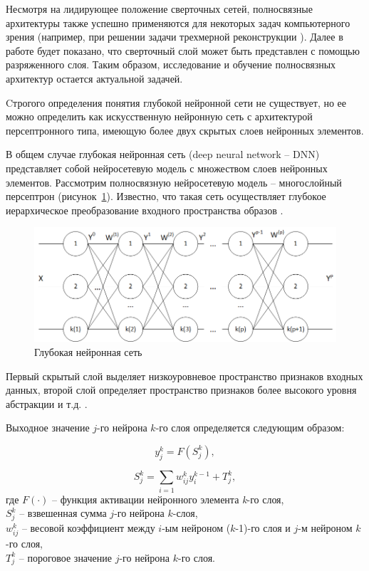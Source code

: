 Несмотря на лидирующее положение сверточных сетей, полносвязные архитектуры также успешно применяются для некоторых задач компьютерного зрения (например, при решении задачи трехмерной реконструкции \cite{mildenhall2020nerf}). Далее в работе будет показано, что сверточный слой может быть представлен с помощью разряженного слоя. Таким образом, исследование и обучение полносвязных архитектур остается актуальной задачей. 

Cтрогого определения понятия глубокой нейронной сети не существует, но ее можно определить как искусственную нейронную сеть с архитектурой персептронного типа, имеющую более двух скрытых слоев нейронных элементов.

В общем случае глубокая нейронная сеть (deep neural network -- DNN) представляет собой нейросетевую модель с множеством слоев нейронных элементов. Рассмотрим полносвязную нейросетевую модель -- многослойный персептрон (рисунок~\ref{fig:pic1_1}). Известно, что такая сеть осуществляет глубокое иерархическое преобразование входного пространства образов \cite{n5}. 

\begin{figure}[H]
  \centering
  \includegraphics[width=\textwidth]{man-source/images/ch1/pic1-1.png}
  \caption{Глубокая нейронная сеть}
  \label{fig:pic1_1}
\end{figure}

Первый скрытый слой выделяет низкоуровневое пространство признаков входных данных, второй слой определяет пространство признаков более высокого уровня абстракции и т.д. \cite{n3}. 

Выходное значение $j$-го нейрона $k$-го слоя определяется следующим образом:

\begin{equation}
y_j^k=F(S_j^k),
\end{equation}

\begin{equation}
S_j^k=\sum_{i=1} w_{ij}^ky_i^{k-1}+T_j^k,
\end{equation}
где $F(\cdot)$ -- функция активации нейронного элемента \textit{k}-го слоя,\\
$S_j^k$ -- взвешенная сумма $j$-го нейрона $k$-слоя,\\
$w_{ij}^k$ -- весовой коэффициент между $i$-ым нейроном ($k$-1)-го слоя и $j$-м нейроном $k$-го слоя,\\
$T_j^k$ -- пороговое значение $j$-го нейрона $k$-го слоя.

